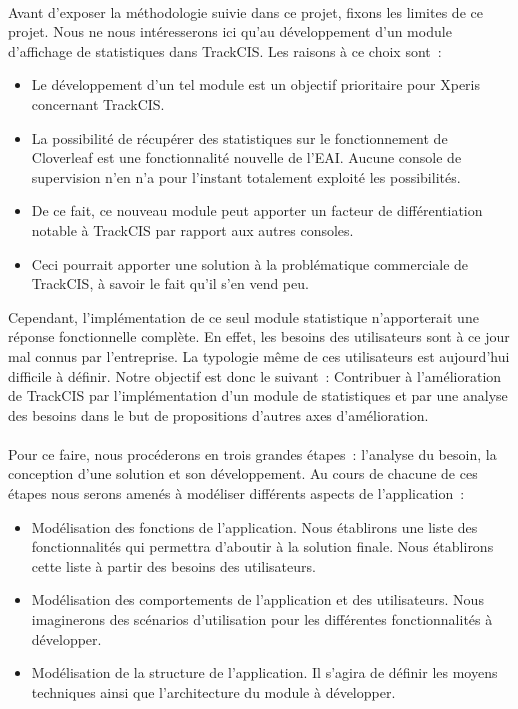 			\paragraph{}%
			Avant d'exposer la méthodologie suivie dans ce projet, fixons les limites de
			ce projet. Nous ne nous intéresserons ici qu'au développement d'un
			module d'affichage de statistiques dans TrackCIS. Les raisons à ce choix
			sont~:
			\begin{itemize}
			  \item Le développement d'un tel module est un objectif prioritaire pour
			  Xperis concernant TrackCIS.
			  \item La possibilité de récupérer des statistiques sur le fonctionnement de
			  Cloverleaf est une fonctionnalité nouvelle de l'EAI. Aucune console de
			  supervision n'en n'a pour l'instant totalement exploité les possibilités.
			  \item De ce fait, ce nouveau module peut apporter un facteur de
			  différentiation notable à TrackCIS par rapport aux autres consoles.
			  \item Ceci pourrait apporter une solution à la problématique commerciale
			  de TrackCIS, à savoir le fait qu'il s'en vend peu.
			\end{itemize}
			Cependant, l'implémentation de ce seul module statistique n'apporterait une
			réponse fonctionnelle complète. En effet, les besoins des utilisateurs sont à
			ce jour mal connus par l'entreprise. La typologie même de ces utilisateurs
			est aujourd'hui difficile à définir.\newline
			Notre objectif est donc le suivant~:\newline
			Contribuer à l'amélioration de TrackCIS par l'implémentation d'un module de
			statistiques et par une analyse des besoins dans le but de propositions
			d'autres axes d'amélioration.

			\paragraph{}%
			Pour ce faire, nous procéderons en trois grandes étapes~: l'analyse du
			besoin, la conception d'une solution et son développement. Au cours de
			chacune de ces étapes nous serons amenés à modéliser différents aspects de
			l'application~:
			\begin{itemize}
			  \item Modélisation des fonctions de l'application. Nous établirons une
			  liste des fonctionnalités qui permettra d'aboutir à la solution finale.
			  Nous établirons cette liste à partir des besoins des utilisateurs.
			  \item Modélisation des comportements de l'application et des utilisateurs.
			  Nous imaginerons des scénarios d'utilisation pour les différentes
			  fonctionnalités à développer.
			  \item Modélisation de la structure de l'application. Il s'agira de définir
			  les moyens techniques ainsi que l'architecture du module à développer.
			\end{itemize}
			
